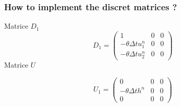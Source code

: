 \documentclass[a4paper, 11pt]{report}
\begin{document}
\subsubsection{How to implement the discret matrices ?}
Matrice $D_1$
\begin{equation*}
D_1=\begin{pmatrix}
1&0&0\\
-\theta \Delta tu_1^n &0&0\\
-\theta\Delta tu_2^n&0&0
\end{pmatrix}
\end{equation*}
Matrice $U$

\begin{equation*}
U_1=\begin{pmatrix}
0&0&0\\
-\theta\Delta th^n&0&0\\
0&0&0
\end{pmatrix}
\end{equation*}
\end{document}
